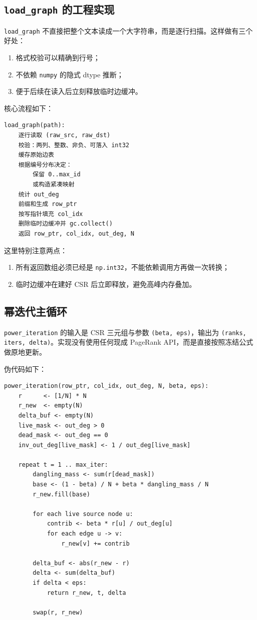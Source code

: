\documentclass[UTF8,a4paper,12pt]{ctexart}
\begin{document}
\subsection{\texttt{load\_graph} 的工程实现}


\texttt{load\_graph} 不直接把整个文本读成一个大字符串，而是逐行扫描。这样做有三个好处：


\begin{enumerate}
\item 格式校验可以精确到行号；
\item 不依赖 \texttt{numpy} 的隐式 dtype 推断；
\item 便于后续在读入后立刻释放临时边缓冲。
\end{enumerate}


核心流程如下：


\begin{lstlisting}
load_graph(path):
    逐行读取 (raw_src, raw_dst)
    校验：两列、整数、非负、可落入 int32
    缓存原始边表
    根据编号分布决定：
        保留 0..max_id
        或构造紧凑映射
    统计 out_deg
    前缀和生成 row_ptr
    按写指针填充 col_idx
    删除临时边缓冲并 gc.collect()
    返回 row_ptr, col_idx, out_deg, N
\end{lstlisting}


这里特别注意两点：


\begin{enumerate}
\item 所有返回数组必须已经是 \texttt{np.int32}，不能依赖调用方再做一次转换；
\item 临时边缓冲在建好 CSR 后立即释放，避免高峰内存叠加。
\end{enumerate}


\subsection{幂迭代主循环}


\texttt{power\_iteration} 的输入是 CSR 三元组与参数 \texttt{(beta, eps)}，输出为 \texttt{(ranks, iters, delta)}。实现没有使用任何现成 PageRank API，而是直接按照冻结公式做原地更新。


伪代码如下：


\begin{lstlisting}
power_iteration(row_ptr, col_idx, out_deg, N, beta, eps):
    r      <- [1/N] * N
    r_new  <- empty(N)
    delta_buf <- empty(N)
    live_mask <- out_deg > 0
    dead_mask <- out_deg == 0
    inv_out_deg[live_mask] <- 1 / out_deg[live_mask]

    repeat t = 1 .. max_iter:
        dangling_mass <- sum(r[dead_mask])
        base <- (1 - beta) / N + beta * dangling_mass / N
        r_new.fill(base)

        for each live source node u:
            contrib <- beta * r[u] / out_deg[u]
            for each edge u -> v:
                r_new[v] += contrib

        delta_buf <- abs(r_new - r)
        delta <- sum(delta_buf)
        if delta < eps:
            return r_new, t, delta

        swap(r, r_new)
\end{lstlisting}
\end{document}
